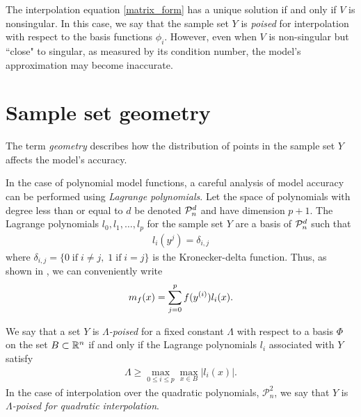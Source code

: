 The interpolation equation \cref{matrix_form} has a unique solution if and only if $V$ is nonsingular.  In this case, we say that the sample set $Y$ is \emph{poised} for interpolation with respect to the basis functions $\phi_i$. 
However, even when $V$ is non-singular but ``close" to singular, as measured by its condition number, the model's approximation may become inaccurate.


\section{Sample set geometry}
\label{geometry}
The term \emph{geometry} describes how the distribution of points in the sample set $Y$ affects the model's accuracy.

In the case of polynomial model functions, a careful analysis of model accuracy can be performed using \emph{Lagrange polynomials}.
Let the space of polynomials with degree less than or equal to $d$ be denoted $\mathcal{P}^d_n$ and have dimension $p+1$.
The Lagrange polynomials $l_0, l_1, \ldots, l_p$ for the sample set $Y$ are a basis of $\mathcal{P}^d_n$ such that
\begin{align}
l_i(y^j) = \delta_{i,j}
\end{align}
where $\delta_{i,j} = \{0 \;\text{if}\; i\ne j,\; 1 \;\text{if} \; i = j \}$ is the Kronecker-delta function.
Thus, as shown in \cite{introduction_book}, we can conveniently write
\begin{align}
\label{reg}
{{m}_f}(x) = \sum^p_{j=0}f(y^{(i)})l_i(x).
\end{align}


We say that a set $Y$ is \emph{$\Lambda$-poised} for a fixed constant $\Lambda$ with respect to a basis $\Phi$ on the set 
$B \subset\mathbb R^n$ if and only if the Lagrange polynomials $l_i$ associated with $Y$ satisfy
\begin{align}
\Lambda \ge \max_{0\le i\le p}\max_{x\in B}|l_i(x)|.
\end{align}
In the case of interpolation over the quadratic polynomials, 
$ \mathcal{P}^2_n$, we say that $Y$ is \emph{$\Lambda$-poised for quadratic interpolation}.

